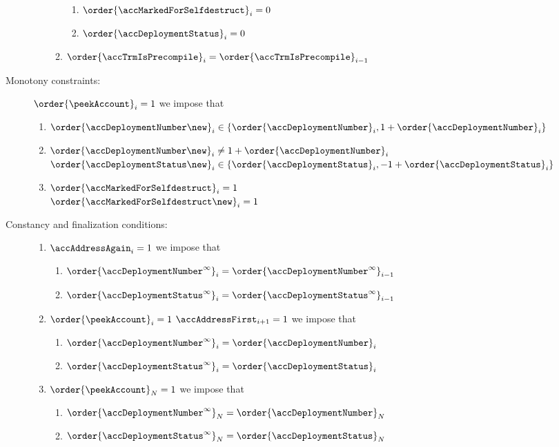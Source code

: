 \begin{description}
\begin{enumerate}
\begin{enumerate}
\begin{enumerate}
							\item $ \order{\accMarkedForSelfdestruct}_{i} = 0 $
							\item $\order{\accDeploymentStatus  }_{i} = 0$
						\end{enumerate}
					\item $\order{\accTrmIsPrecompile}_{i} = \order{\accTrmIsPrecompile}_{i - 1}$
				\end{enumerate}
		\end{enumerate}
	\item[Monotony constraints:]
		\If $\order{\peekAccount}_{i} = 1$ \Then
		we impose that
		\begin{enumerate}
			\item $ \order{\accDeploymentNumber \new }_{i} \in \{ \order{\accDeploymentNumber  }_{i}, 1 + \order{\accDeploymentNumber  }_{i} \} $
			\item \If $ \order{\accDeploymentNumber \new }_{i} \neq 1 + \order{\accDeploymentNumber  }_{i} $ \\
				{} \qquad\qquad \Then $\order{\accDeploymentStatus \new }_{i} \in \{ \order{\accDeploymentStatus  }_{i}, - 1 + \order{\accDeploymentStatus  }_{i} \} $
			\item \If $ \order{\accMarkedForSelfdestruct}_{i} = 1$ \\
				\Then $\order{\accMarkedForSelfdestruct\new}_{i} = 1 $
		\end{enumerate}
	\item[Constancy and finalization conditions:]
		\begin{enumerate}
			\item \If $\accAddressAgain _{i} = 1$ \Then
				we impose that
				\begin{enumerate}
					\item $\order{\accDeploymentNumber^\infty}_{i} = \order{\accDeploymentNumber^\infty}_{i - 1}$ 
					\item $\order{\accDeploymentStatus^\infty}_{i} = \order{\accDeploymentStatus^\infty}_{i - 1}$ 
				\end{enumerate}
			\item \If $\order{\peekAccount}_{i} = 1$ \et $\accAddressFirst _{i + 1} = 1$ \Then
				we impose that
				\begin{enumerate}
					\item $\order{\accDeploymentNumber^\infty}_{i} = \order{\accDeploymentNumber}_{i}$ 
					\item $\order{\accDeploymentStatus^\infty}_{i} = \order{\accDeploymentStatus}_{i}$ 
				\end{enumerate}
			\item \If $\order{\peekAccount}_{N} = 1$ \Then
				we impose that
				\begin{enumerate}
					\item $\order{\accDeploymentNumber^\infty}_{N} = \order{\accDeploymentNumber}_{N}$ 
					\item $\order{\accDeploymentStatus^\infty}_{N} = \order{\accDeploymentStatus}_{N}$ 
				\end{enumerate}
		\end{enumerate}
\end{description}
